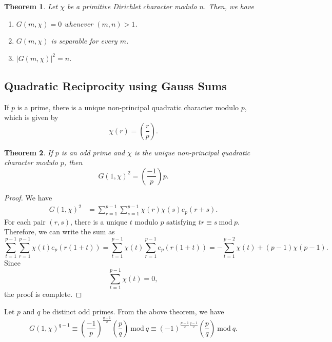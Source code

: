\documentclass[12pt]{article}
\theoremstyle{thmstyle}
\newtheorem{theorem}{Theorem}[section]
\theoremstyle{defstyle}
\renewcommand{\mod}{~\mathrm{mod}~}
\begin{document}
\begin{theorem}
    Let $\chi$ be a primitive Dirichlet character modulo $n$. Then, we have 
    \begin{enumerate}[label=(\alph*)]
        \item $G(m,\chi) = 0$ whenever $(m, n) > 1$. 
        \item $G(m,\chi)$ is separable for every $m$. 
        \item $|G(m,\chi)|^2 = n$.
    \end{enumerate}
\end{theorem}

\subsection{Quadratic Reciprocity using Gauss Sums}

If $p$ is a prime, there is a unique non-principal quadratic character modulo $p$, which is given by 
\begin{equation*}
    \chi(r) = \left(\frac{r}{p}\right).
\end{equation*}

\begin{theorem}
    If $p$ is an odd prime and $\chi$ is the unique non-principal quadratic character modulo $p$, then 
    \begin{equation*}
        G(1,\chi)^2 = \left(\frac{-1}{p}\right)p.
    \end{equation*}
\end{theorem}
\begin{proof}
    We have 
    \begin{align*}
        G(1,\chi)^2 &= \sum_{r = 1}^{p - 1}\sum_{s = 1}^{p - 1} \chi(r)\chi(s)e_p(r + s).
    \end{align*}
    For each pair $(r, s)$, there is a unique $t$ modulo $p$ satisfying $tr\equiv s\mod p$. Therefore, we can write the sum as 
    \begin{equation*}
        \sum_{t = 1}^{p - 1}\sum_{r = 1}^{p - 1}\chi(t)e_p(r(1 + t)) = \sum_{t = 1}^{p - 1}\chi(t)\sum_{r = 1}^{p - 1}e_p(r(1 + t)) = -\sum_{t = 1}^{p - 2}\chi(t) + (p - 1)\chi(p - 1).
    \end{equation*}
    Since 
    \begin{equation*}
        \sum_{t = 1}^{p - 1}\chi(t) = 0,
    \end{equation*}
    the proof is complete.
\end{proof}

Let $p$ and $q$ be distinct odd primes. From the above theorem, we have 
\begin{equation*}
    G(1,\chi)^{q - 1}\equiv\left(\frac{-1}{p}\right)^{\frac{q - 1}{2}}\left(\frac{p}{q}\right)\mod q\equiv(-1)^{\frac{p - 1}{2}\frac{q - 1}{2}}\left(\frac{p}{q}\right)\mod q.
\end{equation*}
\end{document}
